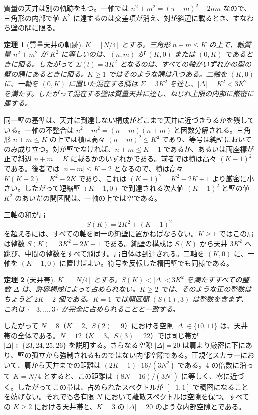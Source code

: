 \documentclass[a4paper]{article}
\newtheorem{theorem}{定理}[section]
\theoremstyle{definition}
\begin{document}
質量の天井は別の軌跡をもつ。一軸では $n^2+m^2=(n+m)^2-2nm$ なので、三角形の内部で値 $K^2$ に達するのは交差項が消え、対が斜辺に載るとき、すなわち壁の隅に限る。

\begin{theorem}[質量天井の軌跡]
\label{thm:mass-locus}
$K=\lfloor N/4\rfloor$ とする。三角形 $n+m\le K$ の上で、軸質量 $n^2+m^2$ が $K^2$ に等しいのは、$(n,m)$ が $(K,0)$ または $(0,K)$ であるときに限る。したがって $\Sigma(t)=3K^2$ となるのは、すべての軸がいずれかの型の壁の隅にあるときに限る。$K\ge 1$ ではそのような隅は八つある。二軸を $(K,0)$ に、一軸を $(0,K)$ に置いた混在する隅は $\Sigma=3K^2$ を達し、$|\Delta|=K^2<3K^2$ を満たす。したがって混在する壁は質量天井に達し、ねじれ上限の内部に厳密に属する。
\end{theorem}

同一壁の基準は、天井に到達しない構成がどこまで天井に近づきうるかを残している。一軸の不整合は $n^2-m^2=(n-m)(n+m)$ と因数分解される。三角形 $n+m\leq K$ の上では積は高々 $(n+m)^2\leq K^2$ であり、等号は純壁においてのみ成り立つ。対が壁でなければ、$n+m\leq K-1$ であるか、あるいは両座標が正で斜辺 $n+m=K$ に載るかのいずれかである。前者では積は高々 $(K-1)^2$ である。後者では $|n-m|\leq K-2$ となるので、積は高々 $K(K-2)=K^2-2K$ であり、これは $(K-1)^2=K^2-2K+1$ より厳密に小さい。したがって短縮壁 $(K-1,0)$ で到達される次大値 $(K-1)^2$ と壁の値 $K^2$ のあいだの開区間は、一軸の上では空である。

三軸の和が肩
\[
S(K)=2K^2+(K-1)^2
\]
を超えるには、すべての軸を同一の純壁に置かねばならない。$K\geq 1$ ではこの肩は整数 $S(K)=3K^2-2K+1$ である。純壁の構成は $S(K)$ から天井 $3K^2$ へ跳び、中間の整数をすべて飛ばす。肩自体は到達される。二軸を $(K,0)$ に、一軸を $(K-1,0)$ に置けばよい。符号を反転した楕円壁でも同様である。

\begin{theorem}[天井帯]
\label{thm:ceiling-band}
$K=\lfloor N/4\rfloor$ とする。$S(K)<|\Delta|<3K^2$ を満たすすべての整数 $\Delta$ は、許容構成によって占められない。$K\geq 2$ では、そのような正の整数はちょうど $2K-2$ 個である。$K=1$ では開区間 $(S(1),3)$ は整数を含まず、これは $\{-3,\ldots,3\}$ が完全に占められることと一致する。
\end{theorem}

したがって $N=8$（$K=2$、$S(2)=9$）における空隙 $|\Delta|\in\{10,11\}$ は、天井帯の全体である。$N=12$（$K=3$、$S(3)=22$）では同じ帯が $|\Delta|\in\{23,24,25,26\}$ を説明する。さらなる空隙 $|\Delta|=20$ は肩より厳密に下にあり、壁の孤立から強制されるものではない内部空隙である。正規化スカラーにおいて、肩から天井までの距離は $(2K-1)\cdot 16/(3N^2)$ である。$4$ の倍数に沿って $K=N/4$ とすると、この距離は $(8N-16)/(3N^2)$ に等しく、零に近づく。したがってこの帯は、占められたスペクトルが $[-1,1]$ で稠密になることを妨げない。それでも各有限 $N$ において離散スペクトルは空隙を保つ。すべての $K\geq 2$ における天井帯と、$K=3$ の $|\Delta|=20$ のような内部空隙とである。
\end{document}
